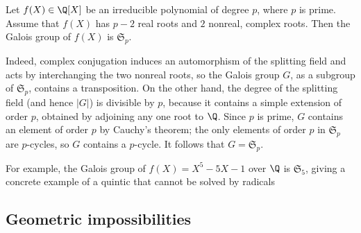 \begin{example}\label{Galois group is S_n eg}
Let $f(X)\in\Q[X]$ be an irreducible polynomial of degree $p$, where $p$ is prime. Assume that $f(X)$ has $p-2$ real roots and $2$ nonreal, complex roots. Then the Galois group of $f(X)$ is $\mathfrak{S}_p$.\par
Indeed, complex conjugation induces an automorphism of the splitting field and acts by interchanging the two nonreal roots, so the Galois group $G$, as a subgroup of $\mathfrak{S}_p$, contains a transposition. On the other hand, the degree of the splitting field (and hence $|G|$) is divisible by $p$, because it contains a simple extension of order $p$, obtained by adjoining any one root to $\Q$. Since $p$ is prime, $G$ contains an element of order $p$ by Cauchy's theorem; the only elements of order $p$ in $\mathfrak{S}_p$ are $p$-cycles, so $G$ contains a $p$-cycle. It follows that $G=\mathfrak{S}_p$.\par
For example, the Galois group of $f(X)=X^5-5X-1$ over $\Q$ is $\mathfrak{S}_5$, giving a concrete example of a quintic that cannot be solved by radicals
\end{example}
\subsection{Geometric impossibilities}
